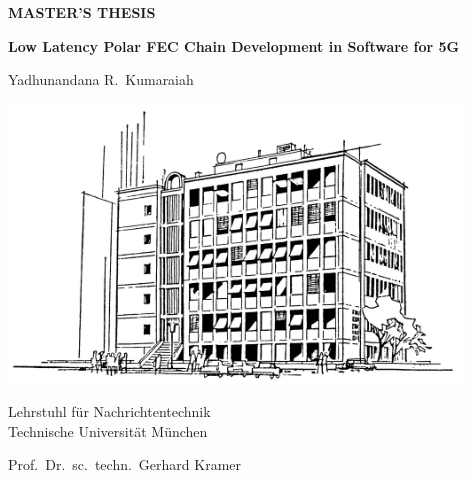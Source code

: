 \documentclass[BCOR10mm]{scrreprt}
\newcommand{\coversheetSubject}[1]{{\large\textbf{\MakeUppercase{#1}}\par}}
\newcommand{\coversheetTitle}[1]{{\Huge\textbf{#1}\par}}
\newcommand{\coversheetAuthor}[1]{{\LARGE#1\par}}
\begin{document}
    \thispagestyle{empty}
    \sffamily
    \parindent0mm

    \vspace*{1.5cm}
    \begin{minipage}[t][9.5cm][t]{\textwidth}
        \begin{center}

            \coversheetSubject{Master's Thesis}

            \par\bigskip\bigskip

            \coversheetTitle{Low Latency Polar FEC Chain Development in Software for 5G}

            \par\bigskip\bigskip

            \coversheetAuthor{Yadhunandana R.\ Kumaraiah}

        \end{center}
    \end{minipage}

    \begin{minipage}[t][9cm][t]{\textwidth}
        \begin{center}
            \includegraphics[width=12cm]{figures-template/sketch-n4.png}

            \par\bigskip\bigskip

            {\Large Lehrstuhl für Nachrichtentechnik\\
            Technische Universität München\par}
            {\large Prof.\ Dr.\ sc.\ techn.\ Gerhard Kramer\Large\par}
        \end{center}
    \end{minipage}
\end{document}
